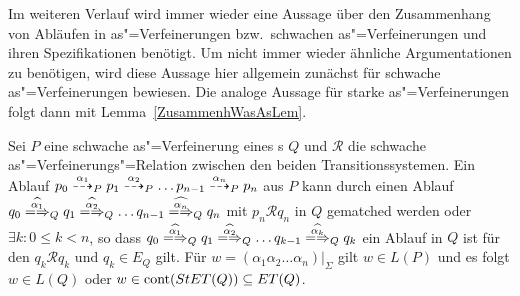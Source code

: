 Im weiteren Verlauf wird immer wieder eine Aussage über den Zusammenhang von
Abläufen in as"=Verfeinerungen bzw.\ schwachen as"=Verfeinerungen und ihren
Spezifikationen benötigt. Um nicht immer wieder ähnliche Argumentationen zu
benötigen, wird diese Aussage hier allgemein zunächst für schwache
as"=Verfeinerungen bewiesen. Die analoge Aussage für starke as"=Verfeinerungen
folgt dann mit Lemma~\ref{ZusammenhWasAsLem}.

\begin{Lem}[Abläufe in schwachen as"=Verfeinerungen und Spezifikationen]
  \label{AblaefeSchwVerfSpezLem}
  Sei $P$ eine schwache as"=Verfeinerung eines \MEIO{}s $Q$ und $\mathcal{R}$
  die schwache as"=Verfeinerungs"=Relation zwischen den beiden
  Transitionssystemen. Ein Ablauf $p_0 \may[\alpha _1]_P p_1 \may[\alpha _2]_P
  \dots p_{n-1} \may[\alpha _n]_P p_n$ aus $P$ kann durch einen Ablauf $q_0
  \weakmay[\widehat{\alpha _1}]_Q q_1 \weakmay[\widehat{\alpha _2}]_Q \dots
  q_{n-1} \weakmay[\widehat{\alpha _n}]_Q q_n$ mit $p_n \mathcal{R} q_n$ in $Q$
  gematched werden oder $\exists k: 0 \leq k < n$, so dass $q_0
  \weakmay[\widehat{\alpha _1}]_Q q_1 \weakmay[\widehat{\alpha _2}]_Q \dots
  q_{k-1} \weakmay[\widehat{\alpha _k}]_Q q_k$ ein Ablauf in $Q$ ist für den
  $q_k \mathcal{R} q_k$ und $q_k\in E_Q$ gilt. Für $w=(\alpha _1\alpha
  _2\dots\alpha _n)|_{\Sigma}$ gilt $w\in L(P)$ und es folgt $w\in L(Q)$ oder
  $w\in\mathrm{cont} (StET (Q))\subseteq ET (Q)$.
\end{Lem}
